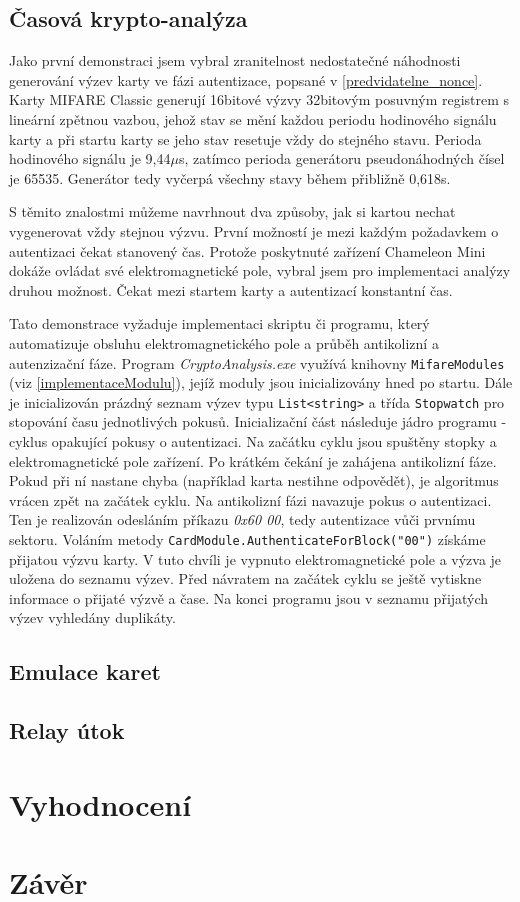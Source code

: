 \section{Časová krypto-analýza}
Jako první demonstraci jsem vybral zranitelnost nedostatečné náhodnosti generování výzev karty ve fázi autentizace, popsané v \ref{predvidatelne_nonce}. Karty MIFARE Classic generují 16bitové výzvy 32bitovým posuvným registrem s lineární zpětnou vazbou, jehož stav se mění každou periodu hodinového signálu karty a při startu karty se jeho stav resetuje vždy do stejného stavu. Perioda hodinového signálu je 9,44$\mu$s, zatímco perioda generátoru pseudonáhodných čísel je 65535. Generátor tedy vyčerpá všechny stavy během přibližně 0,618s. \par
S těmito znalostmi můžeme navrhnout dva způsoby, jak si kartou nechat vygenerovat vždy stejnou výzvu. První možností je mezi každým požadavkem o autentizaci čekat stanovený čas. Protože poskytnuté zařízení Chameleon Mini dokáže ovládat své elektromagnetické pole, vybral jsem pro implementaci analýzy druhou možnost. Čekat mezi startem karty a autentizací konstantní čas.\par
Tato demonstrace vyžaduje implementaci skriptu či programu, který automatizuje obsluhu elektromagnetického pole a průběh antikolizní a autenzizační fáze. Program \emph{CryptoAnalysis.exe} využívá knihovny \verb|MifareModules| (viz \ref{implementaceModulu}), jejíž moduly jsou inicializovány hned po startu. Dále je inicializován prázdný seznam výzev typu \verb|List<string>| a třída \verb|Stopwatch| pro stopování času jednotlivých pokusů. Inicializační část následuje jádro programu - cyklus opakující pokusy o autentizaci. Na začátku cyklu jsou spuštěny stopky a elektromagnetické pole zařízení. Po krátkém čekání je zahájena antikolizní fáze. Pokud při ní nastane chyba (například karta nestihne odpovědět), je algoritmus vrácen zpět na začátek cyklu. Na antikolizní fázi navazuje pokus o autentizaci. Ten je realizován odesláním příkazu \emph{0x60 00}, tedy autentizace vůči prvnímu sektoru. Voláním metody \verb|CardModule.AuthenticateForBlock("00")| získáme přijatou výzvu karty. V tuto chvíli je vypnuto elektromagnetické pole a výzva je uložena do seznamu výzev. Před návratem na začátek cyklu se ještě vytiskne informace o přijaté výzvě a čase. Na konci programu jsou v seznamu přijatých výzev vyhledány duplikáty. 

\section{Emulace karet}


\section{Relay útok}

    \chapter{Vyhodnocení}


\chapter{Závěr}
\label{zaver}


